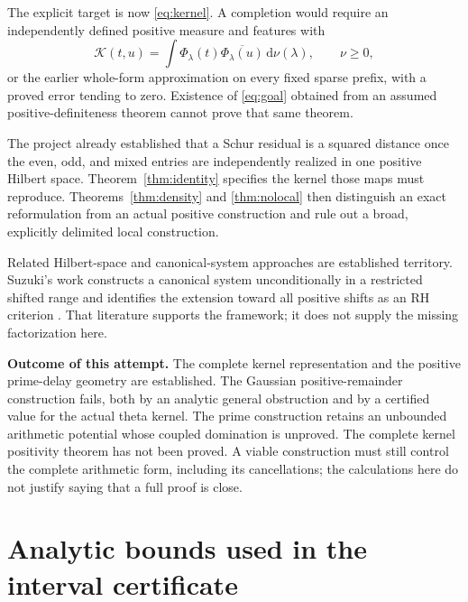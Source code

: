 \documentclass[11pt,letterpaper]{article}
\theoremstyle{remark}\newtheorem{remark}[theorem]{Remark}
\newcommand{\K}{\mathcal K}\newcommand{\dd}{\,\mathrm d}
\numberwithin{equation}{section}
\begin{document}
The explicit target is now \eqref{eq:kernel}. A completion would require an independently defined positive measure and features with
\begin{equation}\label{eq:goal}
\K(t,u)=\int\Phi_\lambda(t)\overline{\Phi_\lambda(u)}\dd\nu(\lambda),
\qquad \nu\ge0,
\end{equation}
or the earlier whole-form approximation on every fixed sparse prefix, with a proved error tending to zero. Existence of \eqref{eq:goal} obtained from an assumed positive-definiteness theorem cannot prove that same theorem.

The project already established that a Schur residual is a squared distance once the even, odd, and mixed entries are independently realized in one positive Hilbert space. Theorem~\ref{thm:identity} specifies the kernel those maps must reproduce. Theorems~\ref{thm:density} and \ref{thm:nolocal} then distinguish an exact reformulation from an actual positive construction and rule out a broad, explicitly delimited local construction.

Related Hilbert-space and canonical-system approaches are established territory. Suzuki's work constructs a canonical system unconditionally in a restricted shifted range and identifies the extension toward all positive shifts as an RH criterion \cite{suzuki}. That literature supports the framework; it does not supply the missing factorization here.

\textbf{Outcome of this attempt.} The complete kernel representation and the positive prime-delay geometry are established. The Gaussian positive-remainder construction fails, both by an analytic general obstruction and by a certified value for the actual theta kernel. The prime construction retains an unbounded arithmetic potential whose coupled domination is unproved. The complete kernel positivity theorem has not been proved. A viable construction must still control the complete arithmetic form, including its cancellations; the calculations here do not justify saying that a full proof is close.

\appendix
\section{Analytic bounds used in the interval certificate}\label{app:tails}
\end{document}
